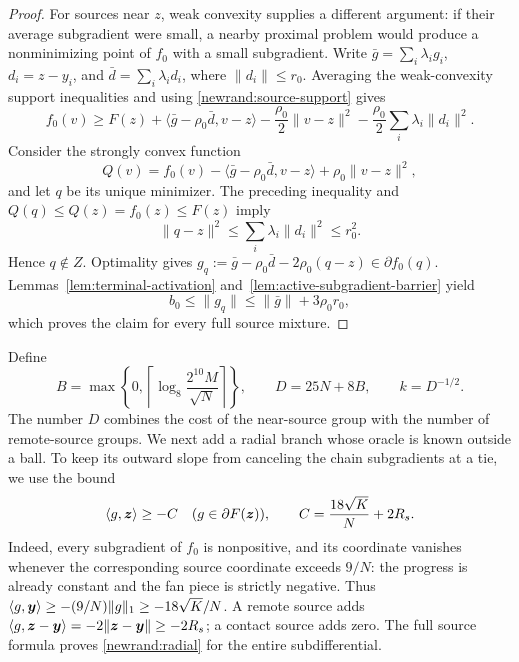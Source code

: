 {\begin{proof}
For sources near $z$, weak convexity supplies a different argument:
if their average subgradient were small, a nearby proximal problem
would produce a nonminimizing point of $f_0$ with a small subgradient.
Write
$\bar g=\sum_i\lambda_i g_i$, $d_i=z-y_i$, and
$\bar d=\sum_i\lambda_i d_i$, where $\|d_i\|\leq r_0$.
Averaging the weak-convexity support inequalities and using
\eqref{newrand:source-support} gives
\[
 f_0(v)\geq F(z)+\langle\bar g-\rho_0\bar d,v-z\rangle
 -\frac{\rho_0}{2}\|v-z\|^2
 -\frac{\rho_0}{2}\sum_i\lambda_i\|d_i\|^2.
\]
Consider the strongly convex function
\[
 Q(v)=f_0(v)-\langle\bar g-\rho_0\bar d,v-z\rangle
                    +\rho_0\|v-z\|^2,
\]
and let $q$ be its unique minimizer. The preceding inequality and
$Q(q)\leq Q(z)=f_0(z)\leq F(z)$ imply
\[
 \|q-z\|^2\leq\sum_i\lambda_i\|d_i\|^2\leq r_0^2.
\]
Hence $q\notin Z$. Optimality gives
$g_q:=\bar g-\rho_0\bar d-2\rho_0(q-z)\in\partial f_0(q)$.
Lemmas~\ref{lem:terminal-activation} and~\ref{lem:active-subgradient-barrier} yield
\[
 b_0\leq\|g_q\|\leq\|\bar g\|+3\rho_0r_0,
\]
which proves the claim for every full source mixture.
\end{proof}

Define
\begin{equation}
 B=\max\left\{0,\left\lceil\log_8
       \frac{2^{10}M}{\sqrt N}\right\rceil\right\},
 \qquad D=25N+8B,\qquad k=D^{-1/2}.
 \label{newrand:bands}
\end{equation}
The number $D$ combines the cost of the near-source group with
the number of remote-source groups. We next add a radial branch
whose oracle is known outside a ball. To keep its outward slope
from canceling the chain subgradients at a tie, we use the bound
\begin{equation}
 \langle g,\bm{z}\rangle\ge-C\quad
 (g\in\partial F(\bm{z})),\qquad
 C=\frac{18\sqrt K}{N}+2R_s.
 \label{newrand:radial}
\end{equation}
Indeed, every subgradient of $f_0$ is nonpositive, and its coordinate
vanishes whenever the corresponding source coordinate exceeds
$9/N$: the progress is already constant and the fan piece is
strictly negative.  Thus
$\langle g,\bm{y}\rangle\ge-(9/N)\|g\|_1\ge-18\sqrt K/N$.
A remote source adds $\langle g,\bm{z}-\bm{y}\rangle=-2\|\bm{z}-\bm{y}\|\ge-2R_s$;
a contact source adds zero.  The full source formula proves
\eqref{newrand:radial} for the entire subdifferential.

}
